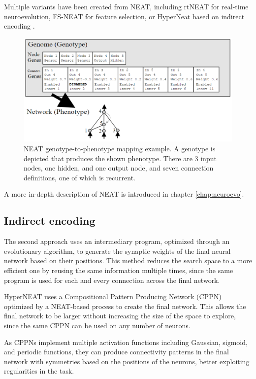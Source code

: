 Multiple variants have been created from NEAT, including rtNEAT \cite{rtNEAT} for real-time neuroevolution, FS-NEAT \cite{FS-NEAT} for feature selection, or HyperNeat based on indirect encoding \cite{HyperNEAT}.

\begin{figure}[H]
 \centering
 \captionsetup{justification=centering, margin=0.5cm}
 \includegraphics[width=14cm]{images/neat.png}
 \caption{\label{NEAT}NEAT genotype-to-phenotype mapping example. A genotype is depicted that produces the shown phenotype. There are 3 input nodes, one hidden, and one output node, and seven connection definitions, one of which is recurrent. \cite{NEAT_2}}
 \label{fig:NEAT}
\end{figure}

A more in-depth description of NEAT is introduced in chapter \ref{chap:neuroevo}.

\subsection{Indirect encoding}

The second approach uses an intermediary program, optimized through an evolutionary algorithm, to generate the synaptic weights of the final neural network based on their positions. This method reduces the search space to a more efficient one by reusing the same information multiple times, since the same program is used for each and every connection across the final network. 

HyperNEAT \cite{HyperNEAT} uses a Compositional Pattern Producing Network (CPPN) \cite{CPPN} optimized by a NEAT-based process to create the final network. This allows the final network to be larger without increasing the size of the space to explore, since the same CPPN can be used on any number of neurons.

As CPPNs implement multiple activation functions including Gaussian, sigmoid, and periodic functions, they can produce connectivity patterns in the final network with symmetries based on the positions of the neurons, better exploiting regularities in the task.

